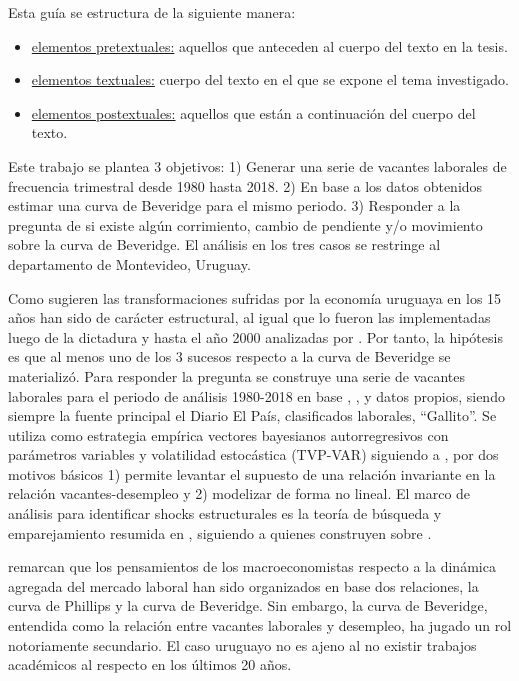 Esta guía se estructura de la siguiente manera: 


\begin{itemize}
\item	\underline{elementos pretextuales:} aquellos que anteceden al cuerpo del texto en la tesis.
\item	\underline{elementos textuales:} cuerpo del texto en el que se expone el tema investigado. 
\item	\underline{elementos postextuales:} aquellos que están a continuación del cuerpo del texto.
\end{itemize}


Este trabajo se plantea 3 objetivos: 1) Generar una serie de vacantes laborales de frecuencia trimestral desde 1980 hasta 2018. 2) En base a los datos obtenidos estimar una curva de Beveridge para el mismo periodo. 3) Responder a la pregunta de si existe algún corrimiento, cambio de pendiente y/o movimiento sobre la curva de Beveridge. El análisis en los tres casos se restringe al departamento de Montevideo, Uruguay.

Como sugieren \cite{Bergara2017} las transformaciones sufridas por la economía uruguaya en los 15 años han sido de carácter estructural, al igual que lo fueron las implementadas luego de la dictadura y hasta el año 2000 analizadas por \cite{Antia2001}. Por tanto, la hipótesis es que al menos uno de los 3 sucesos respecto a la curva de Beveridge se materializó. Para responder la pregunta se construye una serie de vacantes laborales para el periodo de análisis 1980-2018 en base \cite{Rama1988}, \cite{Urrestarazu1997}, \cite{Ceres2012} y datos propios, siendo siempre la fuente principal el Diario El País, clasificados laborales, ``Gallito''. Se utiliza como estrategia empírica vectores bayesianos autorregresivos con parámetros variables y volatilidad estocástica (TVP-VAR) siguiendo a \cite{Nakajima2011, Benati2013, Primiceri2005, Lubik2016b}, por dos motivos básicos 1) permite levantar el supuesto de una relación invariante en la relación vacantes-desempleo y 2) modelizar de forma no lineal. El marco de análisis para identificar shocks estructurales es la teoría de búsqueda y emparejamiento resumida en \cite{Pissarides2000}, siguiendo a \cite{Benati2013} quienes construyen sobre \cite{Shimer2005}.

\cite{Blanchard1989} remarcan que los pensamientos de los macroeconomistas respecto a la dinámica agregada del mercado laboral han sido organizados en base dos relaciones, la curva de Phillips y la curva de Beveridge. Sin embargo, la curva de Beveridge, entendida como la relación entre vacantes laborales y desempleo, ha jugado un rol notoriamente secundario. El caso uruguayo no es ajeno al no existir trabajos académicos al respecto en los últimos 20 años.%
 
